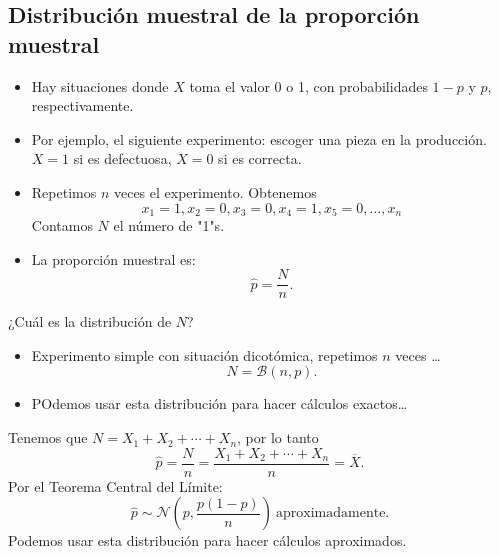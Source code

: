 \subsection{Distribución muestral de la proporción muestral}
\begin{tcolorbox}[colback=blue!5!white, colframe=blue!75!black, title=\textbf{Contexto}]
\begin{itemize}[label=\textbullet]
    \item Hay situaciones donde $X$ toma el valor 0 o 1, con probabilidades $1-p$ y $p$, respectivamente.
    \item Por ejemplo, el siguiente experimento: escoger una pieza en la producción. $X=1$ si es defectuosa,  $X=0$ si es correcta.
    \item Repetimos  $n$ veces el experimento. Obtenemos $$x_1=1,x_2=0,x_3=0,x_4=1,x_5=0,\dots,x_n$$ Contamos $N$ el número de "1"s.
    \item La proporción muestral es: \[
    \hat{p}=\dfrac{N}{n}.
    \] 
\end{itemize}
\end{tcolorbox}
\begin{tcolorbox}[colback=blue!5!white, colframe=blue!75!black, title=\textbf{Distribución exacta de $\hat{p}$}]
¿Cuál es la distribución de $N$?
\begin{itemize}[label=\textbullet]
    \item Experimento simple con situación dicotómica, repetimos $n$ veces \dots \[
    N=\mathcal{B}(n,p).
    \] 
\item POdemos usar esta distribución para hacer cálculos exactos\dots
\end{itemize}
\end{tcolorbox}
\begin{tcolorbox}[colback=blue!5!white, colframe=blue!75!black, title=\textbf{Distribución aproximada de $\hat{p}$}]
Tenemos que $N=X_1+X_2+\cdots+X_n$, por lo tanto \[
    \hat{p}=\dfrac{N}{n}=\dfrac{X_1+X_2+\cdots+X_n}{n}=\overline{X}.
\] 
Por el Teorema Central del Límite: \[
\hat{p}\sim \mathcal{N}\left( p, \dfrac{p(1-p)}{n} \right) \:\text{aproximadamente.}
\] Podemos usar esta distribución para hacer cálculos aproximados.
\end{tcolorbox}
